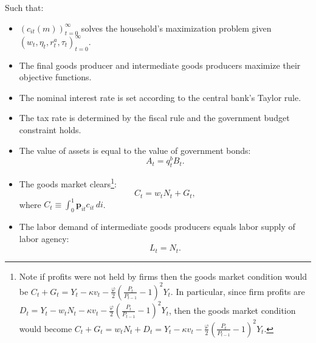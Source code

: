 \documentclass[\econtexRoot/HAFiscal]{subfiles}
\begin{document}
Such that: 
\begin{itemize}[label=--]
\item $\left(c_{it}(m)\right)_{t=0}^{\infty}$  solves the household's maximization problem given $\left( w_{t}, \eta_{t},  r^{a}_{t} , \tau_{t} \right)_{t=0}^{\infty}$.
\item The final goods producer and intermediate goods producers maximize their objective functions.
\item The nominal interest rate is set according to the central bank's Taylor rule.
\item The tax rate is determined by the fiscal rule and the government budget constraint holds.
\item The value of assets is equal to the value of government bonds:
 $$A_t =  q^{b}_{t}B_{t}.$$
\item The goods market clears\footnote{Note if profits were not held by firms then the goods market condition would be $ C_{t}  + G_{t}  = Y_{t} -  \kappa v_{t} - \frac{\varphi}{2}\left( \frac{P_{t}}{P_{t-1}} - 1\right)^{2} Y_{t}  $.  In particular, since firm profits are $D_{t} = Y_{t} -  w_{t} N_{t}  - \kappa v_{t} - \frac{\varphi}{2}\left( \frac{P_{t}}{P_{t-1}} - 1\right)^{2} Y_{t} $, then the goods market condition would become $ C_{t}  + G_{t}  =w_{t} N_{t}  + D_{t} = Y_{t} -  \kappa v_{t} - \frac{\varphi}{2}\left( \frac{P_{t}}{P_{t-1}} - 1\right)^{2} Y_{t}  $. }: 
$$ C_{t}  = w_{t} N_{t}  + G_{t},$$
where $C_{t} \equiv  \int_{0}^{1} \textbf{p}_{it} c_{it}\, di$. 
\item The labor demand of intermediate goods producers equals labor supply of labor agency:
$$ L_{t} =  N_{t}.$$ 
\end{itemize}

%
\end{document}
